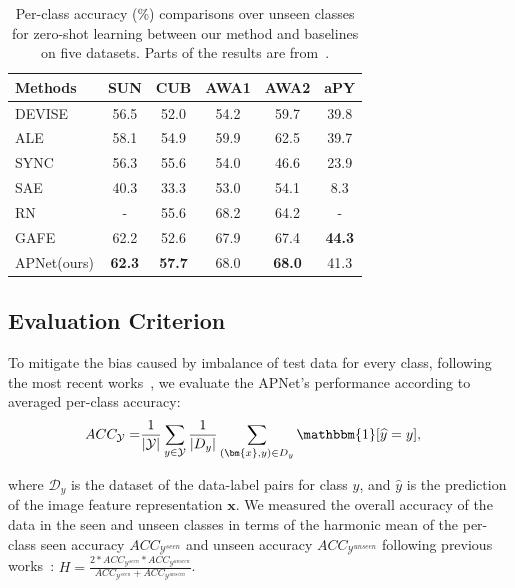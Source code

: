 \documentclass[letterpaper]{article}
\def\vx{{\bm{x}}}
\begin{document}
\begin{table}[t!]
\centering
\caption{Per-class accuracy (\%) comparisons over unseen classes for zero-shot learning between our method and baselines on five datasets. Parts of the results are from~\cite{xian2018zero}.
}
\begin{tabular}{l|c|c|c|c|c}
\toprule
\textbf{Methods}    & \textbf{SUN}  & \textbf{CUB} & \textbf{AWA1} & \textbf{AWA2} & \textbf{aPY}\\
\midrule
DEVISE~\cite{frome2013devise}  & 56.5 & 52.0 & 54.2 & 59.7 & 39.8 \\
ALE~\cite{akata2015label} & 58.1 & 54.9 & 59.9 & 62.5 & 39.7 \\
SYNC~\cite{changpinyo2016synthesized} & 56.3 & 55.6 & 54.0 & 46.6 & 23.9 \\
SAE~\cite{kodirov2017semantic} & 40.3 & 33.3 & 53.0 & 54.1 & 8.3  \\
RN~\cite{sung2018learning} & - & 55.6 & 68.2 & 64.2 & - \\
GAFE~\cite{ijcai2019-graph-auto} & 62.2 & 52.6 & 67.9 & 67.4 & \textbf{44.3} \\
\midrule
APNet(ours) & \textbf{62.3} & \textbf{57.7}  & 68.0  & \textbf{68.0} &  41.3 \\
\bottomrule
\end{tabular}
\label{table:results-zs}
\end{table}



\subsection{Evaluation Criterion}
To mitigate the bias caused by imbalance of test data for every class, following the most recent works~\cite{xian2018zero}, we evaluate the APNet's performance according to averaged per-class accuracy:
\begin{align}
 ACC_{\mathcal{Y}}=&\frac{1}{|\mathcal{Y}|}\sum_{y \in \mathcal{Y}}\frac{1}{|D_y|} \sum_{(\vx, y)\in D_y} \mathbbm{1}[\widehat{y}=y],
\end{align}

where $\mathcal{D}_{y}$ is the dataset of the data-label pairs for class $y$, and $\widehat{y}$ is the prediction of the image feature representation $\vx$.
We measured the overall accuracy of the data in the seen and unseen classes in terms of the harmonic mean of the per-class seen accuracy $ACC_{\mathcal{Y}^{seen}}$ and unseen accuracy $ACC_{\mathcal{Y}^{unseen}}$ following previous works~\cite{xian2018zero}:
$H = \frac{2*ACC_{\mathcal{Y}^{seen}}*ACC_{\mathcal{Y}^{unseen}}}{ACC_{\mathcal{Y}^{seen}}+ACC_{\mathcal{Y}^{unseen}}}$.
\end{document}
